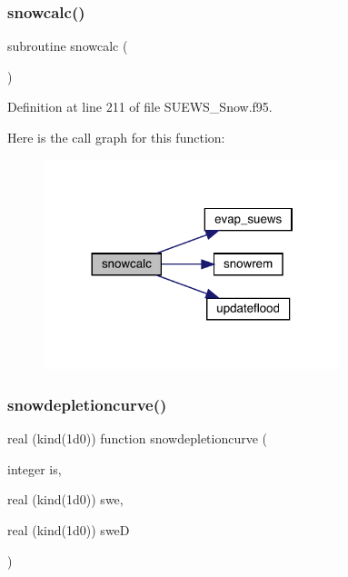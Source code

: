 \subsubsection{\texorpdfstring{snowcalc()}{snowcalc()}}
{\footnotesize\ttfamily subroutine snowcalc (\begin{DoxyParamCaption}{ }\end{DoxyParamCaption})}



Definition at line 211 of file S\+U\+E\+W\+S\+\_\+\+Snow.\+f95.

Here is the call graph for this function\+:\nopagebreak
\begin{figure}[H]
\begin{center}
\leavevmode
\includegraphics[width=245pt]{_s_u_e_w_s___snow_8f95_a2035fba82c9957964a34a3e537c5de1e_cgraph}
\end{center}
\end{figure}
\mbox{\label{_s_u_e_w_s___snow_8f95_a76dc69984f9ab4bba4b6c7b76ca9f497}} 
\subsubsection{\texorpdfstring{snowdepletioncurve()}{snowdepletioncurve()}}
{\footnotesize\ttfamily real (kind(1d0)) function snowdepletioncurve (\begin{DoxyParamCaption}\item[{integer}]{is,  }\item[{real (kind(1d0))}]{swe,  }\item[{real (kind(1d0))}]{sweD }\end{DoxyParamCaption})}



